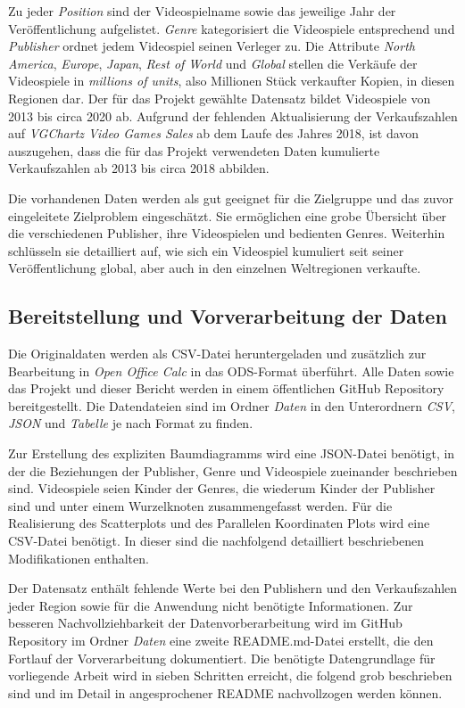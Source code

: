 \documentclass[usegeometry=true]{scrartcl}
\begin{document}
Zu jeder \textit{Position} sind der Videospielname sowie das jeweilige Jahr der Veröffentlichung aufgelistet. 
\textit{Genre} kategorisiert die Videospiele entsprechend und \textit{Publisher} ordnet jedem Videospiel seinen Verleger zu. 
Die Attribute \textit{North America}, \textit{Europe}, \textit{Japan}, \textit{Rest of World} und \textit{Global} stellen die Verkäufe der Videospiele in \textit{millions of units}, also Millionen Stück verkaufter Kopien, in diesen Regionen dar. 
Der für das Projekt gewählte Datensatz bildet Videospiele von 2013 bis circa 2020 ab. 
Aufgrund der fehlenden Aktualisierung der Verkaufszahlen auf \textit{VGChartz Video Games Sales} ab dem Laufe des Jahres 2018, ist davon auszugehen, dass die für das Projekt verwendeten Daten kumulierte Verkaufszahlen ab 2013 bis circa 2018 abbilden. 

Die vorhandenen Daten werden als gut geeignet für die Zielgruppe und das zuvor eingeleitete Zielproblem eingeschätzt.  
Sie ermöglichen eine grobe Übersicht über die verschiedenen Publisher, ihre Videospielen und bedienten Genres. 
Weiterhin schlüsseln sie detailliert auf, wie sich ein Videospiel kumuliert seit seiner Veröffentlichung global, aber auch in den einzelnen Weltregionen verkaufte. 

\subsection{Bereitstellung und Vorverarbeitung der Daten}
Die Originaldaten werden als CSV-Datei heruntergeladen und zusätzlich zur Bearbeitung in \textit{Open Office Calc} in das ODS-Format überführt. 
Alle Daten sowie das Projekt und dieser Bericht werden in einem öffentlichen GitHub Repository bereitgestellt. 
Die Datendateien sind im Ordner \textit{Daten} in den Unterordnern \textit{CSV}, \textit{JSON} und \textit{Tabelle} je nach Format zu finden. 

Zur Erstellung des expliziten Baumdiagramms wird eine JSON-Datei benötigt, in der die Beziehungen der Publisher, Genre und Videospiele zueinander beschrieben sind. 
Videospiele seien Kinder der Genres, die wiederum Kinder der Publisher sind und unter einem Wurzelknoten zusammengefasst werden. 
Für die Realisierung des Scatterplots und des Parallelen Koordinaten Plots wird eine CSV-Datei benötigt. 
In dieser sind die nachfolgend detailliert beschriebenen Modifikationen enthalten. 

Der Datensatz enthält fehlende Werte bei den Publishern und den Verkaufszahlen jeder Region sowie für die Anwendung nicht benötigte Informationen. 
Zur besseren Nachvollziehbarkeit der Datenvorberarbeitung wird im GitHub Repository im Ordner \textit{Daten} eine zweite README.md-Datei erstellt, die den Fortlauf der Vorverarbeitung dokumentiert. 
Die benötigte Datengrundlage für vorliegende Arbeit wird in sieben Schritten erreicht, die folgend grob beschrieben sind und im Detail in angesprochener README nachvollzogen werden können.
\end{document}
